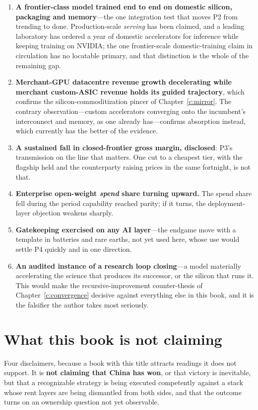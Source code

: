 \begin{enumerate}\setlength{\itemsep}{0pt}\setlength{\parskip}{0pt}
\item \textbf{A frontier-class model trained end to end on domestic silicon, packaging and memory}---the one integration test that moves P2 from trending to done. Production-scale \emph{serving} has been claimed, and a leading laboratory has ordered a year of domestic accelerators for inference while keeping training on NVIDIA; the one frontier-scale domestic-training claim in circulation has no locatable primary, and that distinction is the whole of the remaining gap.
\item \textbf{Merchant-GPU datacentre revenue growth decelerating while merchant custom-ASIC revenue holds its guided trajectory}, which confirms the silicon-commoditization pincer of Chapter~\ref{c:mirror}. The contrary observation---custom accelerators converging onto the incumbent's interconnect and memory, as one already has---confirms absorption instead, which currently has the better of the evidence.
\item \textbf{A sustained fall in closed-frontier gross margin, disclosed}: P3's transmission on the line that matters. One cut to a cheapest tier, with the flagship held and the counterparty raising prices in the same fortnight, is not that.
\item \textbf{Enterprise open-weight \emph{spend} share turning upward.} The spend share fell during the period capability reached parity; if it turns, the deployment-layer objection weakens sharply.
\item \textbf{Gatekeeping exercised on any AI layer}---the endgame move with a template in batteries and rare earths, not yet used here, whose use would settle P4 quickly and in one direction.
\item \textbf{An audited instance of a research loop closing}---a model materially accelerating the science that produces its successor, or the silicon that runs it. This would make the recursive-improvement counter-thesis of Chapter~\ref{c:convergence} decisive against everything else in this book, and it is the falsifier the author takes most seriously.
\end{enumerate}

\section{What this book is not claiming}

Four disclaimers, because a book with this title attracts readings it does not support. It is \textbf{not claiming that China has won}, or that victory is inevitable, but that a recognizable strategy is being executed competently against a stack whose rent layers are being dismantled from both sides, and that the outcome turns on an ownership question not yet observable.

